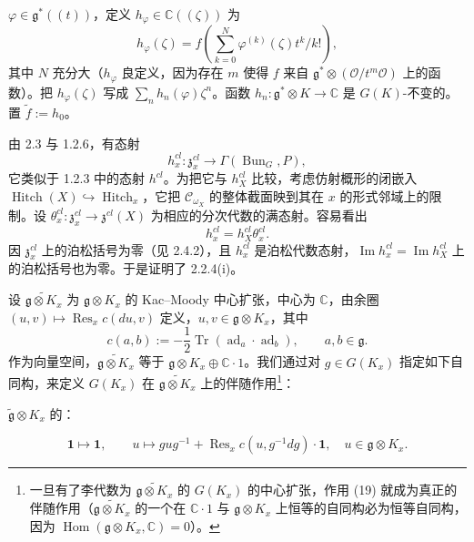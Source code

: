 
$\varphi\in\mathfrak{g}^{*}((t))$，定义 $h_{\varphi}\in\mathbb{C}((\zeta))$ 为
\[
h_{\varphi}(\zeta)=f\left(\sum_{k=0}^{N}\varphi^{(k)}(\zeta)t^{k}/k!\right),
\]
其中 $N$ 充分大（$h_{\varphi}$ 良定义，因为存在 $m$ 使得 $f$ 来自 $\mathfrak{g}^{*}\otimes(\mathcal{O}/t^{m}\mathcal{O})$ 上的函数）。把 $h_{\varphi}(\zeta)$ 写成 $\sum_n h_n(\varphi)\zeta^{n}$。函数 $h_n:\mathfrak{g}^{*}\otimes K\to\mathbb{C}$ 是 $G(K)$-不变的。置 $\tilde{f}:=h_0$。

 由 2.3 与 1.2.6，有态射
\[
h_x^{cl}:\mathfrak{z}_x^{cl}\to\Gamma(\operatorname{Bun}_G,P),
\]
它类似于 1.2.3 中的态射 $h^{cl}$。为把它与 $h_X^{cl}$ 比较，考虑仿射概形的闭嵌入 $\operatorname{Hitch}(X)\hookrightarrow\operatorname{Hitch}_x$，它把 $\mathcal{C}_{\omega_X}$ 的整体截面映到其在 $x$ 的形式邻域上的限制。设 $\theta_x^{cl}:\mathfrak{z}_x^{cl}\to\mathfrak{z}^{cl}(X)$ 为相应的分次代数的满态射。容易看出
\[
h_x^{cl}=h_X^{cl}\theta_x^{cl}.
\]
因 $\mathfrak{z}_x^{cl}$ 上的泊松括号为零（见 2.4.2），且 $h_x^{cl}$ 是泊松代数态射，$\operatorname{Im}h_x^{cl}=\operatorname{Im}h_X^{cl}$ 上的泊松括号也为零。于是证明了 2.2.4(i)。


 设 $\widetilde{\mathfrak{g}\otimes K_x}$ 为 $\mathfrak{g}\otimes K_x$ 的 Kac--Moody 中心扩张，中心为 $\mathbb{C}$，由余圈 $(u,v)\mapsto\operatorname{Res}_x c(du,v)$ 定义，$u,v\in\mathfrak{g}\otimes K_x$，其中
\begin{equation}\tag{18}
c(a,b):=-\frac{1}{2}\operatorname{Tr}(\operatorname{ad}_a\cdot\operatorname{ad}_b),\qquad a,b\in\mathfrak{g}.
\end{equation}
作为向量空间，$\widetilde{\mathfrak{g}\otimes K_x}$ 等于 $\mathfrak{g}\otimes K_x\oplus\mathbb{C}\cdot 1$。我们通过对 $g\in G(K_x)$ 指定如下自同构，来定义 $G(K_x)$ 在 $\widetilde{\mathfrak{g}\otimes K_x}$ 上的伴随作用\footnote{一旦有了李代数为 $\widetilde{\mathfrak{g}\otimes K_x}$ 的 $G(K_x)$ 的中心扩张，作用 (19) 就成为真正的伴随作用（$\widetilde{\mathfrak{g}\otimes K_x}$ 的一个在 $\mathbb{C}\cdot 1$ 与 $\mathfrak{g}\otimes K_x$ 上恒等的自同构必为恒等自同构，因为 $\operatorname{Hom}(\mathfrak{g}\otimes K_x,\mathbb{C})=0$）。}：

$\tilde{\mathfrak{g}}\otimes K_x$ 的：

\begin{equation}\tag{19}
\mathbf{1}\mapsto\mathbf{1},\qquad
u\mapsto gug^{-1}+\operatorname{Res}_x c(u,g^{-1}dg)\cdot\mathbf{1},
\quad u\in\mathfrak{g}\otimes K_x .
\end{equation}


